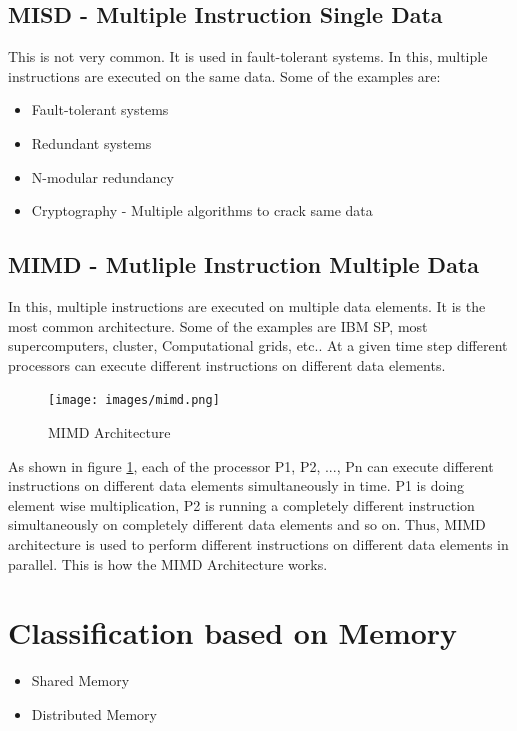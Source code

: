 \documentclass[12pt]{article}
\begin{document}
\subsection{MISD - Multiple Instruction Single Data}
This is not very common. It is used in fault-tolerant systems. In this, multiple instructions are executed on the same data.
Some of the examples are:
\begin{itemize}
    \item Fault-tolerant systems
    \item Redundant systems
    \item N-modular redundancy
    \item Cryptography - Multiple algorithms to crack same data
\end{itemize}
\subsection{MIMD - Mutliple Instruction Multiple Data}
In this, multiple instructions are executed on multiple data elements. It is the most common architecture.
Some of the examples are IBM SP, most supercomputers, cluster, Computational grids, etc..
At a given time step different processors can execute different instructions on different data elements.
\begin{figure}[H]
    \centering
    \texttt{[image: images/mimd.png]}
    \caption{MIMD Architecture}
    \label{fig:mimd}
\end{figure}
As shown in figure \ref{fig:mimd}, each of the processor P1, P2, ..., Pn can execute different instructions on different data elements simultaneously in time.
P1 is doing element wise multiplication, P2 is running a completely different instruction simultaneously on completely different data elements and so on.
Thus, MIMD architecture is used to perform different instructions on different data elements in parallel. This is how the MIMD Architecture works.

\section{Classification based on Memory}
\begin{itemize}
    \item Shared Memory
    \item Distributed Memory
\end{itemize}
\end{document}
